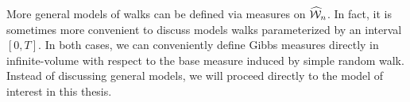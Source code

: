 More general models of walks can be defined via measures on $\widehat{\mathcal{W}}_n$. In fact,
it is sometimes more convenient to discuss models walks parameterized by an
interval $[0, T]$. In both cases, we can conveniently define Gibbs measures
directly in infinite-volume with respect to the base measure induced by simple
random walk. Instead of discussing general models, we will proceed directly to
the model of interest in this thesis.




